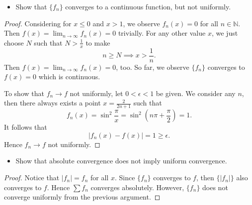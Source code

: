 \begin{Exercise}
	\begin{itemize}
		\item Show that $\{f_n\}$ converges to a continuous function, but not uniformly.
	\end{itemize}
	\begin{proof}
		Considering for $x\leq 0$ and $x > 1$, we observe $f_n(x) = 0$ for all $n\in\mathbb{N}$.
		Then $f(x) = \lim_{n\to\infty}f_n(x) = 0$ trivially.
		For any other value $x$, we just choose $N$ such that $N>\frac{1}{x}$ to make 
		$$
		n\geq N \implies x > \frac{1}{n}.
		$$
		Then $f(x) = \lim_{n\to\infty}f_n(x) = 0$, too.
		So far, we observe $\{f_n\}$ converges to $f(x) = 0$ which is continuous.
		
		To show that $f_n\to f$ not uniformly, let $0<\epsilon<1$ be given.
		We consider any $n$, then there always exists a point $x = \frac{2}{2n+1}$ such that
		$$
		f_n(x) 
		= \sin^2 \frac{\pi}{x} 
		= \sin^2 \left(n\pi + \frac{\pi}{2} \right)
		= 1.
		$$
		It follows that
		$$
		|f_n(x) - f(x)| = 1 \geq \epsilon.
		$$
		Hence $f_n\to f$ not uniformly.
	\end{proof}
	
	\begin{itemize}
		\item Show that absolute convergence does not imply uniform convergence.
	\end{itemize}
	\begin{proof}
		Notice that $|f_n| = f_n$ for all $x$.
		Since $\{f_n\}$ converges to $f$, then $\{|f_n|\}$ also converges to $f$.
		Hence $\sum f_n$ converges absolutely.
		However, $\{f_n\}$ does not converge uniformly from the previous argument.
	\end{proof}
\end{Exercise}